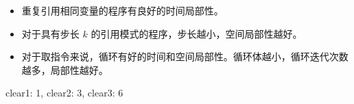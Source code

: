 {{        \begin{itemize}
            \item 重复引用相同变量的程序有良好的时间局部性。
            \item 对于具有步长 $k$ 的引用模式的程序，步长越小，空间局部性越好。
            \item 对于取指令来说，循环有好的时间和空间局部性。循环体越小，循环迭代次数越多，局部性越好。
        \end{itemize}

        \begin{practicec}

        \end{practicec}

        \begin{practicec}
            clear1: 1, clear2: 3, clear3: 6
        \end{practicec}
    }
}
